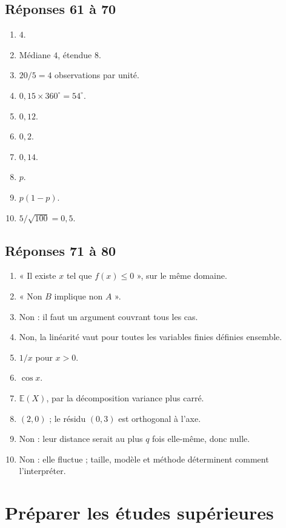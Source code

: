 \documentclass[11pt,a4paper,oneside]{book}
\begin{document}
\section{Réponses 61 à 70}
\begin{enumerate}[start=61]
\item $4$.
\item Médiane $4$, étendue $8$.
\item $20/5=4$ observations par unité.
\item $0{,}15\times360^\circ=54^\circ$.
\item $0{,}12$.
\item $0{,}2$.
\item $0{,}14$.
\item $p$.
\item $p(1-p)$.
\item $5/\sqrt{100}=0{,}5$.
\end{enumerate}
\section{Réponses 71 à 80}
\begin{enumerate}[start=71]
\item « Il existe $x$ tel que $f(x)\le0$ », sur le même domaine.
\item « Non $B$ implique non $A$ ».
\item Non : il faut un argument couvrant tous les cas.
\item Non, la linéarité vaut pour toutes les variables finies définies ensemble.
\item $1/x$ pour $x>0$.
\item $\cos x$.
\item $\mathbb E(X)$, par la décomposition variance plus carré.
\item $(2,0)$ ; le résidu $(0,3)$ est orthogonal à l'axe.
\item Non : leur distance serait au plus $q$ fois elle-même, donc nulle.
\item Non : elle fluctue ; taille, modèle et méthode déterminent comment l'interpréter.
\end{enumerate}

\chapter{Préparer les études supérieures}
\end{document}
